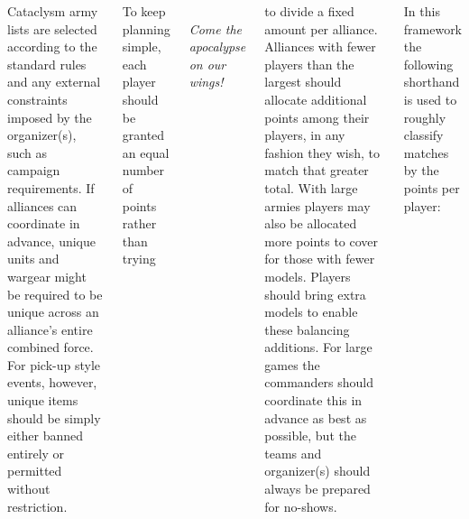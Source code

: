 \documentclass{40k}
\begin{document}
\begin{columns}
Cataclysm army lists are selected according to the standard rules and
any external constraints imposed by the organizer(s), such as campaign
requirements.  If alliances can coordinate in advance, unique units
and wargear might be required to be unique across an alliance's entire
combined force.  For pick-up style events, however, unique items
should be simply either banned entirely or permitted without
restriction.

To keep planning simple, each player should be granted an equal number
of points rather than trying

\columnbreak
\noindent
\begin{minipage}[h]{1.0\linewidth}\centering\small\it%
\\
Come the apocalypse on our wings!
\end{minipage}
\smallskip

\noindent to divide a fixed amount per alliance.  Alliances with fewer
players than the largest should allocate additional points among their
players, in any fashion they wish, to match that greater total.  With
large armies players may also be allocated more points to cover for
those with fewer models.  Players should bring extra models to enable
these balancing additions.  For large games the commanders should
coordinate this in advance as best as possible, but the teams and
organizer(s) should always be prepared for no-shows.



In this framework the following shorthand is used to roughly classify
matches by the points per player:


\end{columns}
\end{document}
